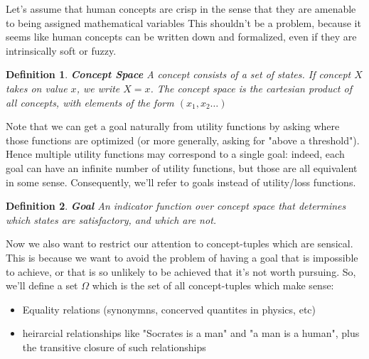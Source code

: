 \documentclass{article}
\newtheorem{definition}{Definition}
\newtheorem{assumption}{Assumption}
\begin{document}
Let's assume that human concepts are crisp in the sense that they are amenable to being assigned mathematical variables
This shouldn't be a problem, because it seems like human concepts can be written down and formalized, even if they are intrinsically soft or fuzzy.

\begin{definition}{\textbf{Concept Space}}
    A concept consists of a set of states. If concept $X$ takes on value $x$, we write $X=x$.
    The concept space is the cartesian product of all concepts, with elements of the form $(x_1,x_2\dots)$
\end{definition}


Note that we can get a goal naturally from utility functions by asking where those functions are optimized (or more generally, asking for "above a threshold"). Hence multiple utility functions may correspond to a single goal: indeed, each goal can have an infinite number of utility functions, but those are all equivalent in some sense. Consequently, we'll refer to goals instead of utility/loss functions.

\begin{definition}{\textbf{Goal}}
    An indicator function over concept space that determines which states are satisfactory, and which are not.
\end{definition}

Now we also want to restrict our attention to concept-tuples which are sensical. This is because we want to avoid the problem of having a goal that is impossible to achieve, or that is so unlikely to be achieved that it's not worth pursuing. So, we'll define a set $\Omega$ which is the set of all concept-tuples which make sense:
\begin{itemize}
    \item Equality relations (synonymns, concerved quantites in physics, etc)
    \item heirarcial relationships like "Socrates is a man" and "a man is a human", plus the transitive closure of such relationships
\end{itemize}
\end{document}
